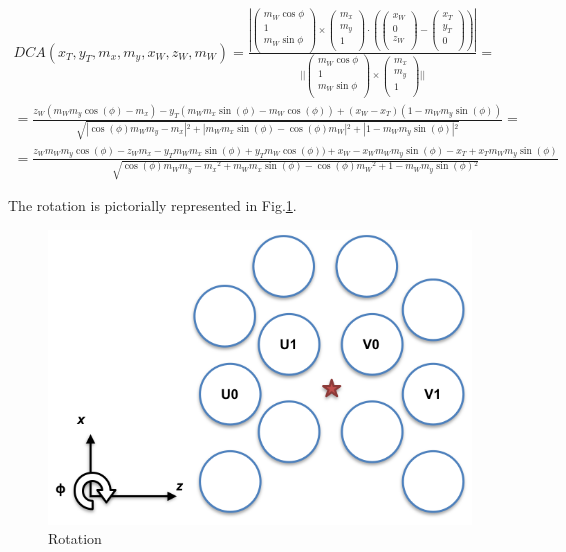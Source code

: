 \documentclass[a4paper,11pt]{article}
\begin{document}
\begin{equation}
\begin{split}
DCA(x_T, y_T, m_x, m_y, x_W, z_W, m_W) = \frac{|\begin{pmatrix} m_W \cos \phi \\ 1\\   m_W \sin \phi\\\end{pmatrix} \times \begin{pmatrix} m_x\\ m_y \\  1\\\end{pmatrix} \cdot (\begin{pmatrix}x_W  \\0 \\  z_W\\\end{pmatrix} - \begin{pmatrix}x_T \\y_T  \\  0\\\end{pmatrix}) |}{||\begin{pmatrix} m_W \cos \phi \\ 1\\  m_W \sin \phi\\\end{pmatrix} \times \begin{pmatrix}m_x\\ m_y \\  1\\\end{pmatrix}||} = 
\\ = \frac{z_W (m_W m_y \cos (\phi)-m_x)-y_T (m_W m_x \sin (\phi)-m_W \cos (\phi))+(x_W-x_T) (1-m_W m_y \sin (\phi))}{\sqrt{\left| \cos (\phi) m_W m_y-m_x\right| {}^2+\left| m_W m_x \sin (\phi)-\cos (\phi) m_W\right| {}^2+\left| 1-m_W m_y \sin (\phi)\right| {}^2}} =
\\ = \frac{z_W m_W m_y \cos (\phi)- z_W m_x- y_T m_W m_x \sin (\phi) + y_T m_W \cos (\phi))+ x_W-x_W m_W m_y \sin (\phi) - x_T +x_T m_W m_y \sin (\phi)}{\sqrt{ \cos (\phi) m_W m_y-m_x {}^2+ m_W m_x \sin (\phi)-\cos (\phi) m_W {}^2+ 1-m_W m_y \sin (\phi){}^2}}
\label{eq:DCARot}
\end{split}
\end{equation}

The rotation is pictorially represented in Fig.\ref{fig:phi}.
\begin{figure}[!ht]
\centering
\includegraphics[width=0.4\linewidth]{fig/phi.png}
\caption{Rotation}
\label{fig:phi}
\end{figure}
\end{document}
